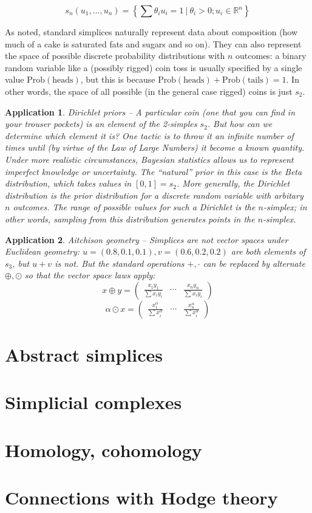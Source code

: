 \documentclass{tufte-handout}
\newtheorem{app}{Application}
\newcommand{\re}{\mathbb{R}}
\begin{document}
\begin{equation}
    s_{n}(u_1,\ldots,u_n) = \left\{\sum \theta_i u_i = 1\ |\  \theta_i>0; u_i\in \re^n \right\}
\end{equation}

As noted, standard simplices naturally represent data about composition (how much of a cake is saturated fats and sugars and so on). They can also represent the space of possible discrete probability distributions with $n$ outcomes: a binary random variable like a (possibly rigged) coin toss is usually specified by a single value $\text{Prob}(\text{heads})$, but this is because $\text{Prob}(\text{heads})+\text{Prob}(\text{tails})=1$. In other words, the space of all possible (in the general case rigged) coins is just $s_2$. 

\begin{app}{Dirichlet priors} -- A particular coin (one that you can find in your trouser pockets) is an element of the 2-simples $s_2$. But how can we determine which element it is? One tactic is to throw it an infinite number of times until (by virtue of the Law of Large Numbers) it become a known quantity. Under more realistic circumstances, Bayesian statistics allows us to represent imperfect knowledge or uncertainty. The ``natural'' prior in this case is the Beta distribution, which takes values in $[0,1]=s_2$. More generally, the Dirichlet distribution is the prior distribution for a discrete random variable with arbitary $n$ outcomes. The range of possible values for such a Dirichlet is the $n$-simplex; in other words, sampling from this distribution generates points in the $n$-simplex.
\end{app}
\begin{app}{Aitchison geometry} -- Simplices are not vector spaces under Euclidean geometry: $u=(0.8,0.1,0.1), v = (0.6,0.2,0.2)$ are both elements of $s_3$, but $u+v$ is not. But the standard operations $+,\cdot$ can be replaced by alternate $\oplus,\odot$ so that the vector space laws apply:
\[
x\oplus y = \begin{pmatrix}\frac{x_1 y_1}{\sum x_i y_i} & \cdots & \frac{x_n y_n}{\sum x_i y_i}\end{pmatrix}
\]
\[
\alpha \odot x = \begin{pmatrix}\frac{x_1^\alpha}{\sum x_i^\alpha} & \cdots & \frac{x_n^\alpha}{\sum x_i^\alpha} \end{pmatrix}
\]
\end{app}
\section{Abstract simplices}

\section{Simplicial complexes}

\section{Homology, cohomology}

\section{Connections with Hodge theory}
\nocite{*}


\end{document}
